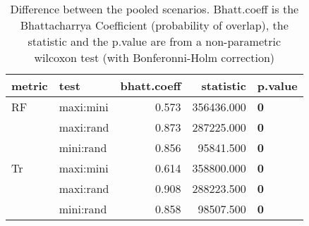 \begin{table}[ht]
\centering
\begin{tabular}{llr|rl}
  \hline
metric & test & bhatt.coeff & statistic & p.value \\ 
  \hline
RF & maxi:mini & 0.573 & 356436.000 & \textbf{0} \\ 
   & maxi:rand & 0.873 & 287225.000 & \textbf{0} \\ 
   & mini:rand & 0.856 & 95841.500 & \textbf{0} \\ 
  Tr & maxi:mini & 0.614 & 358800.000 & \textbf{0} \\ 
   & maxi:rand & 0.908 & 288223.500 & \textbf{0} \\ 
   & mini:rand & 0.858 & 98507.500 & \textbf{0} \\ 
   \hline
\end{tabular}
\caption{Difference between the pooled scenarios. Bhatt.coeff is the Bhattacharrya Coefficient (probability of overlap), the statistic and the p.value are from a non-parametric wilcoxon test (with Bonferonni-Holm correction)} 
\label{Tab_pooledscenarios_test}
\end{table}
